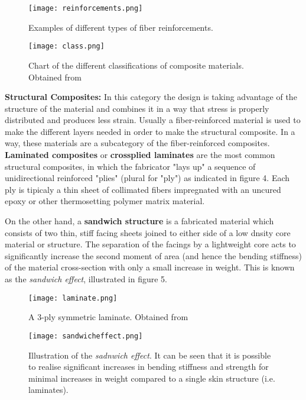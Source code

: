 \documentclass[letterpaper]{article}
\begin{document}
\begin{figure}[H]
	\centering
	\texttt{[image: reinforcements.png]}
	\caption{Examples of different types of fiber reinforcements.}
\end{figure}

\begin{figure}[H]
	\centering
	\texttt{[image: class.png]}
	\caption{Chart of the different classifications of composite materials. Obtained from \autocite{idowu15}}
\end{figure}
\begin{multicols}{2}
	\textbf{Structural Composites:} In this category the design is taking advantage of the structure of the material and combines it in a way that stress is properly distributed and produces less strain. Usually a fiber-reinforced material is used to make the different layers needed in order to make the structural composite. In a way, these materials are a subcategory of the fiber-reinforced composites. \textbf{Laminated composites} or \textbf{crossplied laminates} are the most common structural composites, in which the fabricator "lays up" a sequence of unidirectional reinforced "plies" (plural for "ply") as indicated in figure 4. Each ply is tipicaly a thin sheet of collimated fibers impregnated with an uncured epoxy or other thermosetting polymer matrix material. \supercite{roylance00}
	
	On the other hand, a \textbf{sandwich structure} is a fabricated material which consists of two thin, stiff facing sheets joined to either side of a low dnsity core material or structure. The separation of the facings by a lightweight core acts to significantly increase the second moment of area (and hence the bending stiffness) of the material cross-section with only a small increase in weight. This is known as the \textit{sandwich effect}\supercite{sandcore}, illustrated in figure 5.
	\begin{figure}[H]
		\centering
		\texttt{[image: laminate.png]}
		\caption{A 3-ply symmetric laminate. Obtained from \autocite{roylance00}}
	\end{figure}

	\begin{figure}[H]
		\centering
		\texttt{[image: sandwicheffect.png]}
		\caption{Illustration of the \textit{sadnwich effect}. It can be seen that it is possible to realise significant increases in bending stiffness and strength for minimal increases in weight compared to a single skin structure (i.e. laminates).\supercite{sandcore}}
	\end{figure}

\end{multicols}
\end{document}
